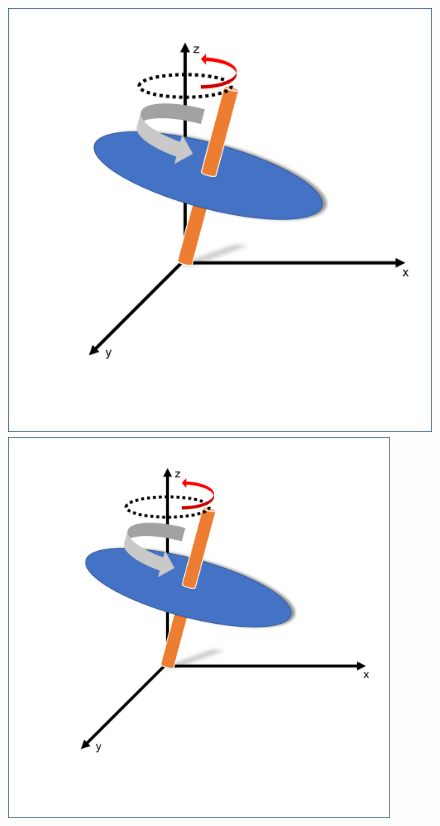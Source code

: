 \documentclass[10pt]{beamer}
\begin{document}
\begin{frame}
\begin{figure}[h]
\begin{minipage}{0.45\textwidth}
	\centering
	\includegraphics[width=1.1\textwidth]{sphere1.png}
\end{minipage}
	\begin{minipage}{0.45\textwidth}
		\centering
		\includegraphics[width=0.9\textwidth]{sphere1.png}
	\end{minipage}
\end{figure}

\end{frame}
\end{document}
